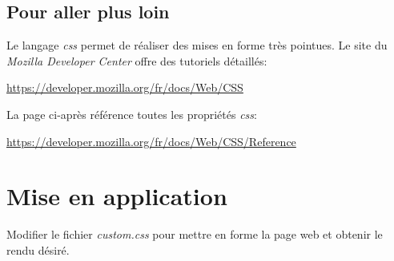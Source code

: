 \documentclass[a4paper,11pt]{article}
\begin{document}
\begin{Form}
\subsection{Pour aller plus loin}
Le langage \emph{css} permet de réaliser des mises en forme très pointues. Le site du \emph{Mozilla Developer Center} offre des tutoriels détaillés:
\begin{center}
\url{https://developer.mozilla.org/fr/docs/Web/CSS}
\end{center}
La page ci-après référence toutes les propriétés \emph{css}:
\begin{center}
\url{https://developer.mozilla.org/fr/docs/Web/CSS/Reference}
\end{center}
\section{Mise en application}
\begin{activite}
Modifier le fichier \emph{custom.css} pour mettre en forme la page web et obtenir le rendu désiré.
\end{activite}
\end{Form}
\end{document}
